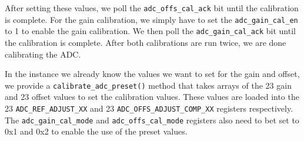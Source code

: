 After setting these values, we poll the \texttt{adc\_offs\_cal\_ack} bit until the calibration is complete.
For the gain calibration, we simply have to set the \texttt{adc\_gain\_cal\_en} to 1 to enable the gain calibration.
We then poll the \texttt{adc\_gain\_cal\_ack} bit until the calibration is complete. 
After both calibrations are run twice, we are done calibrating the ADC. 

In the instance we already know the values we want to set for the gain and offset, we provide a \texttt{calibrate\_adc\_preset()} method that takes arrays of the 23 gain and 23 offset values to set the calibration values.
These values are loaded into the 23 \texttt{ADC\_REF\_ADJUST\_XX} and 23 \texttt{ADC\_OFFS\_ADJUST\_COMP\_XX} registers respectively.
The \texttt{adc\_gain\_cal\_mode} and \texttt{adc\_offs\_cal\_mode} registers also need to bet set to 0x1 and 0x2 to enable the use of the preset values.

